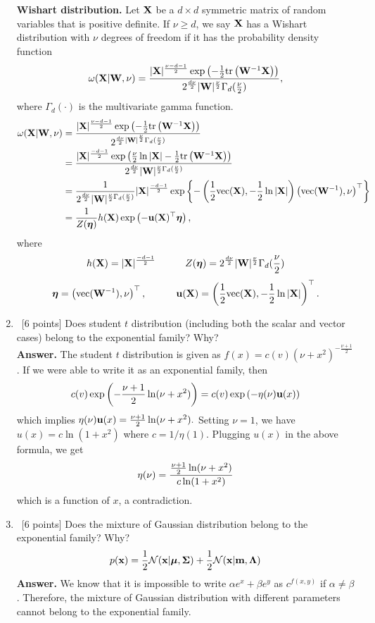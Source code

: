 \documentclass[12pt, fullpage,letterpaper]{article}
\def\red{\color{red}}
\def\blackblue{\color{black!40!blue}}
\begin{document}
\begin{enumerate}
{{\red \bf Wishart distribution.}
Let ${\bf X}$ be a $d\times d$ symmetric matrix of random variables that is positive definite.  If $\nu\geq d$, we say ${\bf X}$ has a Wishart distribution with $\nu$ degrees of freedom if it has the probability density function
$$\mathbf{\omega}({\bf X}|{\bf W},\nu) = \frac{|{\bf X}|^{\frac{\nu-d-1}{2}}\exp\left(-\frac12{\rm tr}\left({\bf W}^{-1}{\bf X}\right)\right)}{2^{\frac{d\nu}{2}}|{\bf W}|^{\frac{\nu}{2}}\Gamma_d(\frac{\nu}{2})},$$
where $\Gamma_d(\cdot)$ is the multivariate gamma function.
\begin{align*}
\mathbf{\omega}({\bf X}|{\bf W},\nu) 
& = \frac{|{\bf X}|^{\frac{\nu-d-1}{2}}\exp\left(-\frac12{\rm tr}\left({\bf W}^{-1}{\bf X}\right)\right)}{2^{\frac{d\nu}{2}|{\bf W}|^{\frac{\nu}{2}}\Gamma_d(\frac{\nu}{2})}}\\
& = \frac{|{\bf X}|^\frac{-d-1}{2}\exp\left(\frac{\nu}{2}\ln |{\bf X}|-\frac12{\rm tr}\left({\bf W}^{-1}{\bf X}\right)\right)}{2^{\frac{d\nu}{2}}|{\bf W}|^{\frac{\nu}{2}\Gamma_d(\frac{\nu}{2})}}\\
& = \frac{1}{2^{\frac{d\nu}{2}}|{\bf W}|^{\frac{\nu}{2}\Gamma_d(\frac{\nu}{2})}}
|{\bf X}|^\frac{-d-1}{2}
\exp\left\{-\left(\frac12{\rm vec}({\bf X}), -\frac12\ln|{\bf X}|\right)\left({\rm vec}({\bf W}^{-1}), \nu\right)^\top\right\}\\
& = \frac{1}{Z(\boldsymbol{\eta})}h({\bf X}) \exp\left(-{\bf u}({\bf X})^\top\boldsymbol{\eta}\right),
\end{align*}
where 
$$h({\bf X})=|{\bf X}|^\frac{-d-1}{2}\quad\quad\quad Z(\boldsymbol{\eta}) = 2^{\frac{d\nu}{2}}|{\bf W}|^{\frac{\nu}{2}}\Gamma_d(\frac{\nu}{2})$$
$$\boldsymbol{\eta}  = \left({\rm vec}({\bf W}^{-1}), \nu\right)^\top, \quad\quad\quad {\bf u}({\bf X}) = \left(\frac12{\rm vec}({\bf X}), -\frac12\ln|{\bf X}|\right)^\top.$$


}
\item~[6 points] Does student $t$ distribution (including both the scalar and vector cases) belong to the exponential family? Why?\\
{\red \bf Answer.}{\blackblue 
The student $t$ distribution is given as $f(x) = c(v)(\nu+x^2)^{-\frac{\nu+1}{2}}$.
If we were able to write it as an exponential family, then  
$$c(v)\exp\left({{-\frac{\nu+1}{2}}\ln(\nu+x^2)}\right) = c(v)\exp\left(-\eta(\nu){\bf u}(x)\right)$$
which implies $\eta(\nu){\bf u}(x) = \frac{\nu+1}{2}\ln(\nu+x^2).$ Setting $\nu =1$, we have $u(x) = c \ln(1+x^2)$ where $c= 1/\eta(1)$.
Plugging  $u(x)$ in the above formula, we get  
$$\eta(\nu) = { \frac{\nu+1}{2}\ln(\nu+x^2)\over c \ln(1+x^2)}$$ which is a function of $x$, a contradiction. 
}

\item~[6 points] Does the mixture of Gaussian distribution belong to the exponential family? Why? 
\[
p({\bf x}) = \frac{1}{2}\mathcal{N}({\bf x}|\boldsymbol{\mu}, \boldsymbol{\Sigma}) + \frac{1}{2}\mathcal{N}({\bf x}|{\bf m}, \mathbf{\Lambda})
\]
{\red \bf Answer.} {\blackblue We know that it is impossible to write $\alpha e^x + \beta e^y$ as $c^{f(x,y)}$ if $\alpha\neq \beta$. Therefore, the mixture of Gaussian distribution with different parameters cannot belong to the exponential family.}


\end{enumerate}
\end{document}
